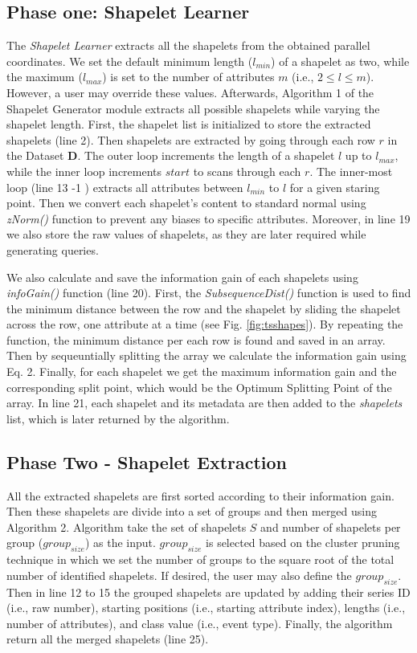 \documentclass[conference]{IEEEtran}  %
\begin{document}
\subsection{Phase one: Shapelet Learner}
The \textit{Shapelet Learner} extracts all the shapelets from the obtained parallel coordinates. We set the default minimum length ($l_{min}$) of a shapelet as two, while the maximum ($l_{max}$) is set to the number of attributes $m$ (i.e., $2 \leq l \leq m$). However, a user may override these values. Afterwards, Algorithm 1 of the Shapelet Generator module extracts all possible shapelets while varying the shapelet length. First, the shapelet list is initialized to store the extracted shapelets (line 2). Then shapelets are extracted by going through each row $r$ in the Dataset \textbf{D}. The outer loop increments the length of a shapelet $l$ up to $l_{max}$, while the inner loop increments $start$ to scans through each $r$. The inner-most loop (line 13 -1 ) extracts all attributes between $l_{min}$ to $l$ for a given staring point. Then we convert each shapelet’s content to standard normal using \textit{zNorm()} function to prevent any biases to specific attributes. Moreover, in line 19 we also store the raw values of shapelets, as they are later required while generating queries. 

We also calculate and save the information gain of each shapelets using \textit{infoGain()} function (line 20). First, the \textit{SubsequenceDist()} function is used to find the minimum distance between the row and the shapelet by sliding the shapelet across the row, one attribute at a time (see Fig. \ref{fig:tsshapes}). By repeating the function, the minimum distance per each row is found and saved in an array. Then by sequeuntially splitting the array we calculate the information gain using Eq. 2. Finally, for each shapelet we get the maximum information gain and the corresponding split point, which would be the Optimum Splitting Point of the array. In line 21, each shapelet and its metadata are then added to the \textit{shapelets} list, which is later returned by the algorithm.

\subsection{Phase Two - Shapelet Extraction}
All the extracted shapelets are first sorted according to their information gain. Then these shapelets are divide into a set of groups and then merged using Algorithm 2. Algorithm take the set of shapelets $S$ and number of shapelets per group ($group_{size}$) as the input. 
$group_{size}$ is selected based on the cluster pruning technique in which we set the number of groups to the square root of the total number of identified shapelets. If desired, the user may also define the $group_{size}$. Then in line 12 to 15 the grouped shapelets are updated by adding their series ID (i.e., raw number), starting positions (i.e., starting attribute index), lengths (i.e., number of attributes), and class value (i.e., event type). Finally, the algorithm return all the merged shapelets (line 25).
\end{document}
